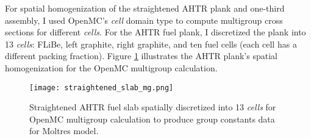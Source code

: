 For spatial homogenization of the straightened \gls{AHTR} plank and 
one-third assembly, I used OpenMC's \textit{cell} domain type to compute 
multigroup cross sections for different \textit{cells}. 
For the \gls{AHTR} fuel plank, I discretized the plank into 13 \textit{cells}:
FLiBe, left graphite, right graphite, and ten fuel cells (each cell has a different 
packing fraction).
Figure \ref{fig:straightened_slab_mg} illustrates the \gls{AHTR} plank's spatial 
homogenization for the OpenMC multigroup calculation. 
\begin{figure}[htbp]
    \centering
    \texttt{[image: straightened\_slab\_mg.png]}
    \raggedright
    \caption{Straightened \acrfull{AHTR} fuel slab spatially discretized into 
    13 \textit{cells} for OpenMC multigroup calculation to produce group constants 
    data for Moltres model.}
    \label{fig:straightened_slab_mg}
\end{figure}

